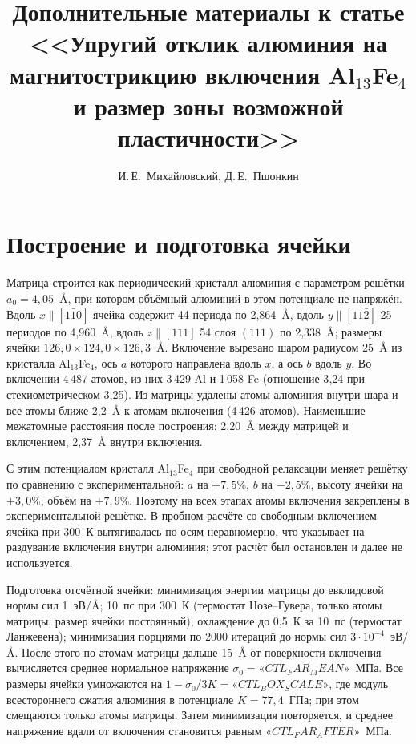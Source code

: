 \documentclass[11pt,a4paper]{article}
\title{Дополнительные материалы к статье <<Упругий отклик алюминия на магнитострикцию включения Al$_{13}$Fe$_4$
и размер зоны возможной пластичности>>}
\author{И.\,Е.~Михайловский, Д.\,Е.~Пшонкин}
\date{}
\begin{document}
\maketitle

\section{Построение и подготовка ячейки}

Матрица строится как периодический кристалл алюминия с параметром решётки
$a_0=4{,}05$~\AA{}, при котором объёмный алюминий в этом потенциале
не напряжён. Вдоль $x\parallel[1\bar10]$ ячейка содержит 44 периода
по 2{,}864~\AA{}, вдоль $y\parallel[11\bar2]$ 25 периодов по 4{,}960~\AA{},
вдоль $z\parallel[111]$ 54 слоя $(111)$ по 2{,}338~\AA{}; размеры ячейки
$126{,}0\times124{,}0\times126{,}3$~\AA{}. Включение вырезано шаром радиусом
25~\AA{} из кристалла Al$_{13}$Fe$_4$, ось $a$ которого направлена вдоль $x$,
а ось $b$ вдоль $y$. Во включении 4\,487 атомов, из них 3\,429 Al и 1\,058 Fe
(отношение 3{,}24 при стехиометрическом 3{,}25). Из матрицы удалены атомы
алюминия внутри шара и все атомы ближе 2{,}2~\AA{} к атомам включения
(4\,426 атомов). Наименьшие межатомные расстояния после построения:
2{,}20~\AA{} между матрицей и включением, 2{,}37~\AA{} внутри включения.

С этим потенциалом кристалл Al$_{13}$Fe$_4$ при свободной релаксации
меняет решётку по сравнению с экспериментальной: $a$ на $+7{,}5\%$,
$b$ на $-2{,}5\%$, высоту ячейки на $+3{,}0\%$, объём на $+7{,}9\%$.
Поэтому на всех этапах атомы включения закреплены в экспериментальной
решётке. В пробном расчёте со свободным включением ячейка при 300~К
вытягивалась по осям неравномерно, что указывает на раздувание включения
внутри алюминия; этот расчёт был остановлен и далее не используется.

Подготовка отсчётной ячейки: минимизация энергии матрицы до евклидовой нормы
сил 1~эВ/\AA{}; 10~пс при 300~К (термостат Нозе--Гувера, только атомы
матрицы, размер ячейки постоянный); охлаждение до 0{,}5~К за 10~пс
(термостат Ланжевена); минимизация порциями по 2000 итераций до нормы сил
$3\cdot10^{-4}$~эВ/\AA{}. После этого по атомам матрицы дальше 15~\AA{}
от поверхности включения вычисляется среднее нормальное напряжение
$\sigma_0=«CTL_FAR_MEAN»$~МПа. Все размеры ячейки умножаются на
$1-\sigma_0/3K=«CTL_BOX_SCALE»$, где модуль всестороннего сжатия алюминия
в потенциале $K=77{,}4$~ГПа; при этом смещаются только атомы матрицы.
Затем минимизация повторяется, и среднее напряжение вдали от включения
становится равным $«CTL_FAR_AFTER»$~МПа.
\end{document}
